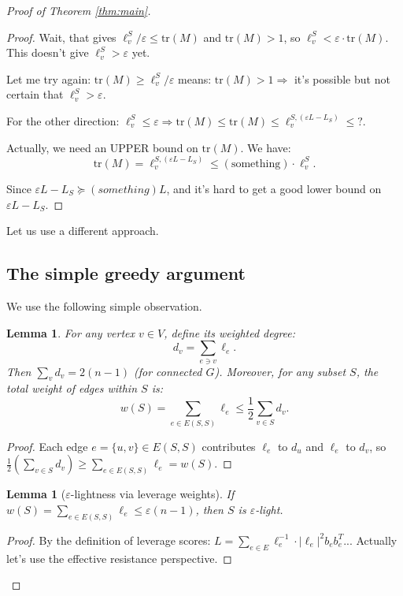 \documentclass[12pt]{article}
\newtheorem{lemma}[theorem]{Lemma}
\begin{document}
\begin{proof}[Proof of Theorem \ref{thm:main}]
\begin{proof}
Wait, that gives $\ell_v^S / \varepsilon \leq \mathrm{tr}(M)$ and $\mathrm{tr}(M) > 1$, so $\ell_v^S < \varepsilon \cdot \mathrm{tr}(M)$. This doesn't give $\ell_v^S > \varepsilon$ yet.

Let me try again: $\mathrm{tr}(M) \geq \ell_v^S / \varepsilon$ means: $\mathrm{tr}(M) > 1 \Rightarrow$ it's possible but not certain that $\ell_v^S > \varepsilon$.

For the other direction: $\ell_v^S \leq \varepsilon \Rightarrow \mathrm{tr}(M) \leq \mathrm{tr}(M) \leq \ell_v^{S, (\varepsilon L - L_S)} \leq ?$.

Actually, we need an UPPER bound on $\mathrm{tr}(M)$. We have:
\[
\mathrm{tr}(M) = \ell_v^{S, (\varepsilon L - L_S)} \leq (\text{something}) \cdot \ell_v^S.
\]

Since $\varepsilon L - L_S \succeq (something) L$, and it's hard to get a good lower bound on $\varepsilon L - L_S$.

\end{proof}

Let us use a different approach.

\subsection{The simple greedy argument}

We use the following simple observation.

\begin{lemma}\label{lem:greedy-simple}
For any vertex $v \in V$, define its \emph{weighted degree}:
\[
d_v = \sum_{e \ni v} \ell_e.
\]
Then $\sum_v d_v = 2(n-1)$ (for connected $G$). Moreover, for any subset $S$, the total weight of edges within $S$ is:
\[
w(S) = \sum_{e \in E(S,S)} \ell_e \leq \frac{1}{2} \sum_{v \in S} d_v.
\]

\end{lemma}

\begin{proof}
Each edge $e = \{u,v\} \in E(S,S)$ contributes $\ell_e$ to $d_u$ and $\ell_e$ to $d_v$, so $\frac{1}{2}(\sum_{v \in S} d_v) \geq \sum_{e \in E(S,S)} \ell_e = w(S)$.
\end{proof}

\begin{lemma}[$\varepsilon$-lightness via leverage weights]\label{lem:ell-light}
If $w(S) = \sum_{e \in E(S,S)} \ell_e \leq \varepsilon(n-1)$, then $S$ is $\varepsilon$-light.
\end{lemma}

\begin{proof}
By the definition of leverage scores: $L = \sum_{e \in E} \ell_e^{-1} \cdot |\ell_e|^2 b_e b_e^T$... Actually let's use the effective resistance perspective.


\end{proof}
\end{proof}
\end{document}
